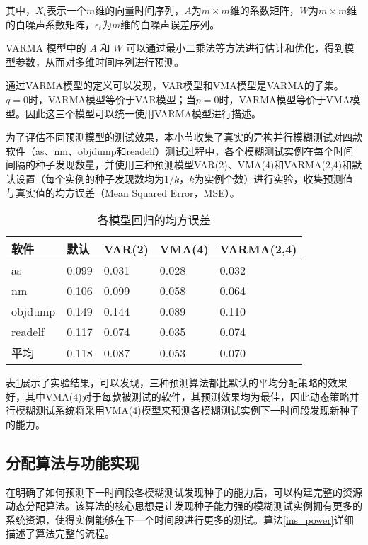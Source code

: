 \documentclass[master]{thesis-uestc}
\begin{document}
其中，$X_t$表示一个$m$维的向量时间序列，$A$为$m \times m$维的系数矩阵，$W$为$m \times m$维的白噪声系数矩阵，$\epsilon_t$为$m$维的白噪声误差序列。

VARMA 模型中的 $A$ 和 $W$ 可以通过最小二乘法等方法进行估计和优化，得到模型参数，从而对多维时间序列进行预测。

通过VARMA模型的定义可以发现，VAR模型和VMA模型是VARMA的子集。$q=0$时，VARMA模型等价于VAR模型；当$p=0$时，VARMA模型等价于VMA模型。因此这三个模型可以统一使用VARMA模型进行描述。

为了评估不同预测模型的测试效果，本小节收集了真实的异构并行模糊测试对四款软件（as、nm、objdump和readelf）测试过程中，各个模糊测试实例在每个时间间隔的种子发现数量，并使用三种预测模型VAR(2)、VMA(4)和VARMA(2,4)和默认设置（每个实例的种子发现数均为$1/k$，$k$为实例个数）进行实验，收集预测值与真实值的均方误差（Mean Squared Error，MSE）。

\begin{table}[!htbp]
    \caption{各模型回归的均方误差}
    \begin{tabular}{lllll}
    \toprule
    软件 & 默认 & VAR(2) & VMA(4) & VARMA(2,4) \\
    \midrule
    as & 0.099 & 0.031 & 0.028 & 0.032 \\
    nm & 0.106 & 0.099 & 0.058 & 0.064 \\
    objdump & 0.149 & 0.144 & 0.089 & 0.110 \\
    readelf & 0.117 & 0.074 & 0.035 & 0.074 \\
    \hline
    平均 & 0.118 & 0.087 & 0.053 & 0.070 \\
    \bottomrule
    \end{tabular}
    \label{table_model}
    \vspace{6pt}
\end{table}

表\ref{table_model}展示了实验结果，可以发现，三种预测算法都比默认的平均分配策略的效果好，其中VMA(4)对于每款被测试的软件，其预测效果均为最佳，因此动态策略并行模糊测试系统将采用VMA(4)模型来预测各模糊测试实例下一时间段发现新种子的能力。

\subsection{分配算法与功能实现}

在明确了如何预测下一时间段各模糊测试发现种子的能力后，可以构建完整的资源动态分配算法。该算法的核心思想是让发现种子能力强的模糊测试实例拥有更多的系统资源，使得实例能够在下一个时间段进行更多的测试。算法\ref{ins_power}详细描述了算法完整的流程。
\end{document}
